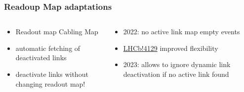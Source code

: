 \documentclass[aspectratio=1610, 12pt, xcolor=dvipsnames]{beamer}
\begin{document}
\begin{frame}\frametitle{Readoup Map adaptations}
  \begin{columns}
    \begin{column}[c]{0.48\textwidth}
      \begin{itemize}
        \item Readout map \to Cabling Map
        \item automatic fetching of deactivated links
        \item \to deactivate links without changing readout map!
      \end{itemize}
    \end{column}
    \begin{column}[c]{0.48\textwidth}
      \begin{itemize}
        \item 2022: no active link map \to  empty events
        \item \href{https://gitlab.cern.ch/lhcb/LHCb/-/merge_requests/4129}{LHCb!4129} improved flexibility
        \item 2023: allows to ignore dynamic link deactivation if no active link found
      \end{itemize}
    \end{column}
  \end{columns}
\end{frame}
\end{document}
